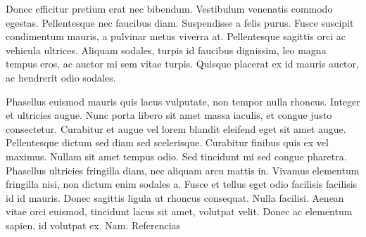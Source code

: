 \documentclass[
    a4paper, %
    10pt, %
    unnumbered sections, %
    two side, %
]{LTJournalArticle}
\begin{document}
Donec efficitur pretium erat nec bibendum. Vestibulum venenatis commodo egestas. Pellentesque nec faucibus diam. Suspendisse a felis purus. Fusce suscipit condimentum mauris, a pulvinar metus viverra at. Pellentesque sagittis orci ac vehicula ultrices. Aliquam sodales, turpis id faucibus dignissim, leo magna tempus eros, ac auctor mi sem vitae turpis. Quisque placerat ex id mauris auctor, ac hendrerit odio sodales.

Phasellus euismod mauris quis lacus vulputate, non tempor nulla rhoncus. Integer et ultricies augue. Nunc porta libero sit amet massa iaculis, et congue justo consectetur. Curabitur et augue vel lorem blandit eleifend eget sit amet augue. Pellentesque dictum sed diam sed scelerisque. Curabitur finibus quis ex vel maximus. Nullam sit amet tempus odio. Sed tincidunt mi sed congue pharetra. Phasellus ultricies fringilla diam, nec aliquam arcu mattis in. Vivamus elementum fringilla nisi, non dictum enim sodales a. Fusce et tellus eget odio facilisis facilisis id id mauris. Donec sagittis ligula ut rhoncus consequat. Nulla facilisi. Aenean vitae orci euismod, tincidunt lacus sit amet, volutpat velit. Donec ac elementum sapien, id volutpat ex. Nam.
{Referencias}
\printbibliography %
\end{document}
